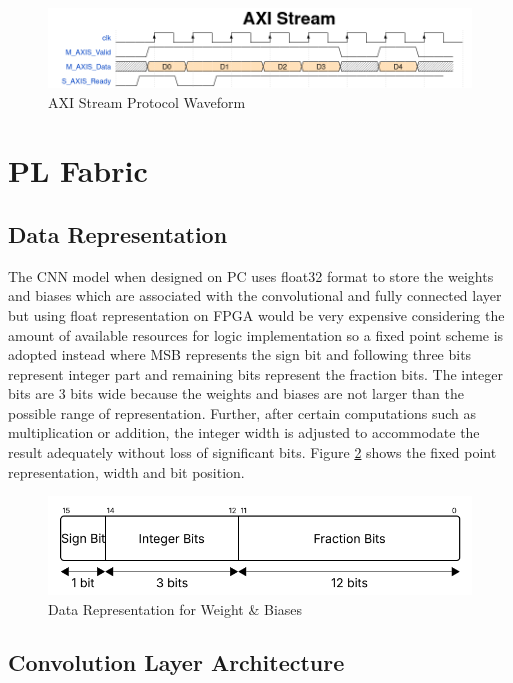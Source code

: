     
    \begin{figure}[H]
    \centering
    \includegraphics[width=\textwidth]{images/AXI_StreamWaveDrom.png}
    \caption{AXI Stream Protocol Waveform}
    \label{fig:axi_stream_waveform}
    \end{figure}

    \section{PL Fabric}
    \subsection{Data Representation}
    \noindent
    The CNN model when designed on PC uses float32 format to store the weights and biases which are associated with the convolutional and fully connected layer but using float representation on FPGA would be very expensive considering the amount of available resources for logic implementation so a fixed point scheme is adopted instead where MSB represents the sign bit and following three bits represent integer part and remaining bits represent the fraction bits. The integer bits are 3 bits wide because the weights and biases are not larger than the possible range of representation. Further, after certain computations such as multiplication or addition, the integer width is adjusted to accommodate the result adequately without loss of significant bits. Figure \ref{fig:fixed_point} shows the fixed point representation, width and bit position.

    \begin{figure}[ht]
    \centering
    \includegraphics[width=\linewidth]{images/Data_16Bit_Representation.png}
    \caption{Data Representation for Weight \& Biases}
    \label{fig:fixed_point}
    \end{figure}

    \subsection{Convolution Layer Architecture} \label{sec:conv_architecture}
    \noindent

